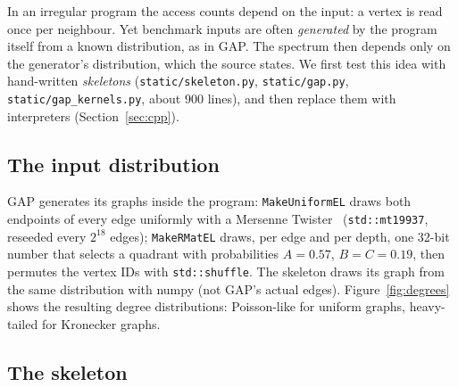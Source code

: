 \documentclass[11pt]{article}
\newcommand{\term}[1]{\emph{#1}}
\newcommand{\code}[1]{\texttt{#1}}
\newcommand{\secref}[1]{Section~\ref{#1}}
\newcommand{\figref}[1]{Figure~\ref{#1}}
\begin{document}
In an irregular program the access counts depend on the input: a vertex is read once per neighbour. Yet benchmark
inputs are often \emph{generated} by the program itself from a known distribution, as in GAP. The spectrum then
depends only on the generator's distribution, which the source states. We first test this idea with hand-written
\term{skeletons} (\code{static/skeleton.py}, \code{static/gap.py}, \code{static/gap\_kernels.py}, about 900 lines),
and then replace them with interpreters (\secref{sec:cpp}).

\subsection{The input distribution}

GAP generates its graphs inside the program: \code{MakeUniformEL} draws both endpoints of every edge uniformly with a
Mersenne Twister~\cite{matsumoto1998mt} (\code{std::mt19937}, reseeded every $2^{18}$ edges); \code{MakeRMatEL}
draws, per edge and per depth, one 32-bit number that selects a quadrant with probabilities $A=0.57$,
$B=C=0.19$, then permutes the vertex IDs with \code{std::shuffle}. The skeleton draws its graph from the same
distribution with numpy (not GAP's actual edges). \figref{fig:degrees} shows the resulting degree distributions:
Poisson-like for uniform graphs, heavy-tailed for Kronecker graphs.

\subsection{The skeleton}
\end{document}
